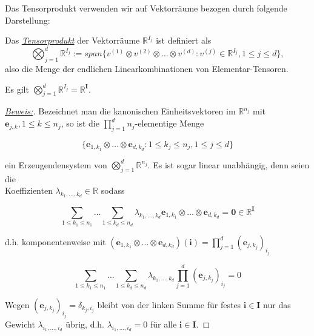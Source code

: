 \documentclass[11pt]{article} %
\begin{document}
\begin{changemargin}{0pt}{0pt}
Das Tensorprodukt verwenden wir auf Vektorräume bezogen durch folgende Darstellung:

\begin{definition}
Das \underline{\textit{Tensorprodukt}} der Vektorräume $\mathbb{R}^{I_{j}}$ ist definiert als
\begin{equation}
\bigotimes^{d}_{j=1} \mathbb{R}^{I_{j}} := span \{ v^{(1)} \otimes v^{(2)} \otimes \dots \otimes v^{(d)} : v^{(j)} \in \mathbb{R}^{I_{j}},
1\leq j \leq d \},
\end{equation} also die Menge der endlichen Linearkombinationen von Elementar-Tensoren.
\end{definition}

\newpage
\begin{lemma}
Es gilt $\bigotimes^{d}_{j=1} \mathbb{R}^{I_{j}} = \mathbb{R}^{\mathbf{I}}$.
\end{lemma}

\begin{proof}[\underline{Beweis:}\nopunct]
Bezeichnet man die kanonischen Einheitsvektoren im $\mathbb{R}^{n_{j}}$ mit $\mathbf{e}_{j,k}, 1\leq k\leq n_{j}$, so ist
die $\prod^{d}_{j=1} n_{j}$-elementige Menge

\[ \{\mathbf{e}_{1,k_{1}}\otimes \dots \otimes \mathbf{e}_{d,k_{d}} : 1\leq k_{j} \leq n_{j}, 1\leq j\leq d\} \]

ein Erzeugendensystem von $\bigotimes^{d}_{j=1} \mathbb{R}^{n_{j}}$. Es ist sogar linear unabhängig, denn seien die\\
Koeffizienten
$\lambda_{k_{1},\dots,k_{d}} \in \mathbb{R}$ sodass

\[ \sum_{1\leq k_{1}\leq n_{1}} \dots \sum_{1\leq k_{d}\leq n_{d}} \lambda_{k_{1},\dots,k_{d}} \mathbf{e}_{1,k_{1}} \otimes \dots
\otimes \mathbf{e}_{d,k_{d}} = \mathbf{0} \in \mathbb{R}^{\mathbf{I}} \]

d.h. komponentenweise mit $(\mathbf{e}_{1,k_{1}} \otimes \dots \otimes \mathbf{e}_{d,k_{d}})(\mathbf{i}) = \prod^{d}_{j=1} (\mathbf{e}_{j,k_{j}})_{i_j}$

\[ \sum_{1\leq k_{1}\leq n_{1}} \dots \sum_{1\leq k_{d}\leq n_{d}} \lambda_{k_{1},\dots,k_{d}}  \prod^{d}_{j=1} (\mathbf{e}_{j,k_{j}})_{i_j} = 0 \]

Wegen $(\mathbf{e}_{j,k_{j}})_{i_j} = \delta_{k_{j},i_{j}}$ bleibt von der linken Summe für festes $\mathbf{i} \in \mathbf{I}$ nur das Gewicht
$\lambda_{i_{1},\dots,i_{d}}$ übrig, d.h. $\lambda_{i_{1},\dots,i_{d}} = 0$ für alle $\mathbf{i} \in \mathbf{I}$.

\end{proof}

\end{changemargin}
\end{document}
